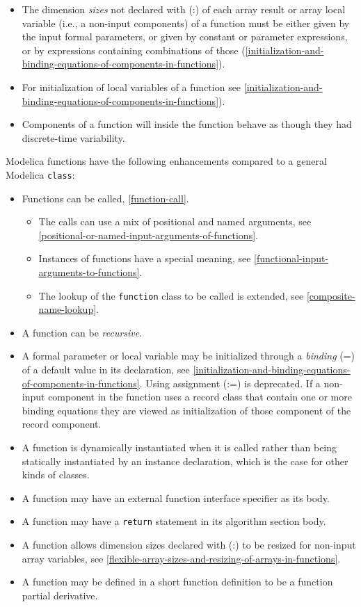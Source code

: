 \begin{itemize}
\item
  The dimension \emph{sizes} not declared with (:) of each array result
  or array local variable (i.e., a non-input components) of a
  function must be either given by the input formal parameters, or given
  by constant or parameter expressions, or by expressions containing
  combinations of those (\cref{initialization-and-binding-equations-of-components-in-functions}).
\item
  For initialization of local variables of a function see \cref{initialization-and-binding-equations-of-components-in-functions}).
\item
  Components of a function will inside the function behave as though
  they had discrete-time variability.
\end{itemize}

Modelica functions have the following enhancements compared to a general
Modelica \lstinline!class!:
\begin{itemize}
\item
  Functions can be called, \cref{function-call}.

  \begin{itemize}
  \item
    The calls can use a mix of positional and named arguments, see
    \cref{positional-or-named-input-arguments-of-functions}.
  \item
    Instances of functions have a special meaning, see \cref{functional-input-arguments-to-functions}.
  \item
    The lookup of the \lstinline!function! class to be called is extended, see \cref{composite-name-lookup}.
  \end{itemize}
\item
  A function can be \emph{recursive}.
\item
  A formal parameter or local variable may be initialized through a
  \emph{binding} (=) of a default value in its declaration,
  see \cref{initialization-and-binding-equations-of-components-in-functions}.
  Using assignment (:=) is deprecated. If a non-input component in the
  function uses a record class that contain one or more binding
  equations they are viewed as initialization of those component of the
  record component.
\item
  A function is dynamically instantiated when it is called rather than
  being statically instantiated by an instance declaration, which is the
  case for other kinds of classes.
\item
  A function may have an external function interface specifier as its
  body.
\item
  A function may have a \lstinline!return! statement in its algorithm section body.
\item
  A function allows dimension sizes declared with (:) to be resized for
  non-input array variables, see \cref{flexible-array-sizes-and-resizing-of-arrays-in-functions}.
\item
  A function may be defined in a short function definition to be a
  function partial derivative.
\end{itemize}

